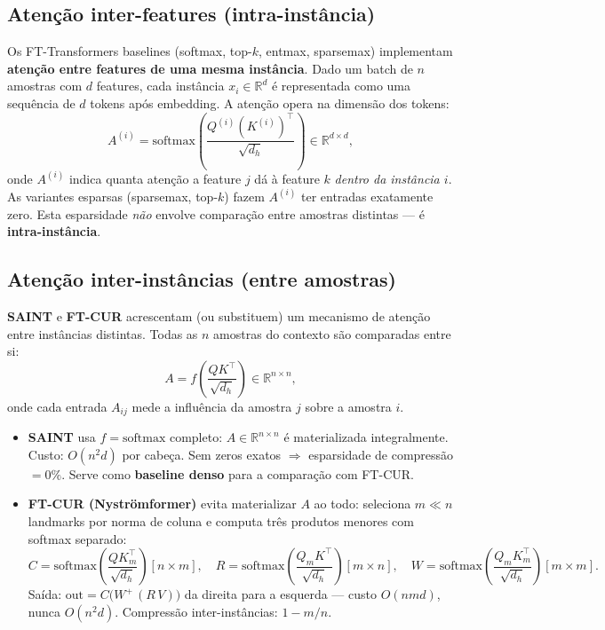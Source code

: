 \documentclass[12pt,a4paper]{article}
\begin{document}
\subsection{Atenção inter-features (intra-instância)}

Os FT-Transformers baselines (softmax, top-$k$, entmax, sparsemax) implementam
\textbf{atenção entre features de uma mesma instância}. Dado um batch de $n$
amostras com $d$ features, cada instância $x_i \in \mathbb{R}^d$ é representada
como uma sequência de $d$ tokens após embedding. A atenção opera na dimensão
dos tokens:
\[
  A^{(i)} = \text{softmax}\!\left(\frac{Q^{(i)} (K^{(i)})^\top}{\sqrt{d_h}}\right)
  \in \mathbb{R}^{d \times d},
\]
onde $A^{(i)}$ indica quanta atenção a feature $j$ dá à feature $k$ \emph{dentro
da instância $i$}. As variantes espar\-sas (sparsemax, top-$k$) fazem $A^{(i)}$
ter entradas exatamente zero. Esta esparsidade \emph{não} envolve comparação
entre amostras distintas --- é \textbf{intra-instância}.

\subsection{Atenção inter-instâncias (entre amostras)}

\textbf{SAINT} e \textbf{FT-CUR} acrescentam (ou substituem) um mecanismo de
atenção entre instâncias distintas. Todas as $n$ amostras do contexto são
comparadas entre si:
\[
  A = f\!\left(\frac{Q K^\top}{\sqrt{d_h}}\right) \in \mathbb{R}^{n \times n},
\]
onde cada entrada $A_{ij}$ mede a influência da amostra $j$ sobre a amostra $i$.

\begin{tcolorbox}[colback=fixbg, colframe=fixborder, fonttitle=\bfseries,
  title=\textbf{SAINT vs.\ FT-CUR: atenção inter-instâncias densa vs.\ comprimida}]
\begin{itemize}
  \item \textbf{SAINT} usa $f = \text{softmax}$ completo: $A \in \mathbb{R}^{n \times n}$
        é materializada integralmente. Custo: $O(n^2 d)$ por cabeça. Sem zeros exatos
        $\Rightarrow$ esparsidade de compressão $= 0\%$. Serve como \textbf{baseline
        denso} para a comparação com FT-CUR.
  \item \textbf{FT-CUR (Nyströmformer)} evita materializar $A$ ao todo:
        seleciona $m \ll n$ landmarks por norma de coluna e computa três produtos
        menores com softmax separado:
        \[
          C = \text{softmax}\!\!\left(\frac{Q K_m^\top}{\sqrt{d_h}}\right)\![n{\times}m],
          \quad
          R = \text{softmax}\!\!\left(\frac{Q_m K^\top}{\sqrt{d_h}}\right)\![m{\times}n],
          \quad
          W = \text{softmax}\!\!\left(\frac{Q_m K_m^\top}{\sqrt{d_h}}\right)\![m{\times}m].
        \]
        Saída: $\text{out} = C\bigl(W^+\,(R\,V)\bigr)$ da direita para a esquerda ---
        custo $O(nmd)$, nunca $O(n^2 d)$. Compressão inter-instâncias: $1 - m/n$.
\end{itemize}
\end{tcolorbox}
\end{document}
